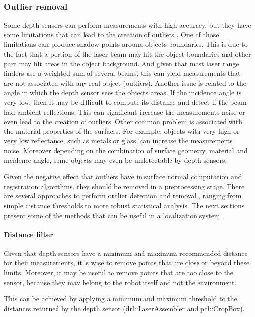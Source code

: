 \subsubsection{Outlier removal}

Some depth sensors can perform measurements with high accuracy, but they have some limitations that can lead to the creation of outliers \cite{Sotoodeh2006}. One of those limitations can produce shadow points around objects boundaries. This is due to the fact that a portion of the laser beam may hit the object boundaries and other part may hit areas in the object background. And given that most laser range finders use a weighted sum of several beams, this can yield measurements that are not associated with any real object (outliers). Another issue is related to the angle in which the depth sensor sees the objects areas. If the incidence angle is very low, then it may be difficult to compute its distance and detect if the beam had ambient reflections. This can significant increase the measurements noise or even lead to the creation of outliers. Other common problem is associated with the material properties of the surfaces. For example, objects with very high or very low reflectance, such as metals or glass, can increase the measurements noise. Moreover depending on the combination of surface geometry, material and incidence angle, some objects may even be undetectable by depth sensors.

Given the negative effect that outliers have in surface normal computation and registration algorithms, they should be removed in a preprocessing stage. There are several approaches to perform outlier detection and removal \cite{YangZhang2010}, ranging from simple distance thresholds to more robust statistical analysis. The next sections present some of the methods that can be useful in a localization system.


\paragraph{Distance filter}

Given that depth sensors have a minimum and maximum recommended distance for their measurements, it is wise to remove points that are close or beyond these limits. Moreover, it may be useful to remove points that are too close to the sensor, because they may belong to the robot itself and not the environment.

This can be achieved by applying a minimum and maximum threshold to the distances returned by the depth sensor (drl::LaserAssembler and pcl::CropBox).


